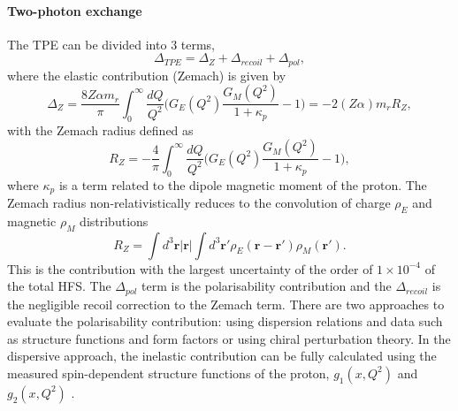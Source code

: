 \documentclass[12pt]{article}
\begin{document}
\paragraph{Two-photon exchange}
The TPE can be divided into $3$ terms,
\begin{equation}
\Delta_{TPE} = \Delta_{Z} + \Delta_{recoil} + \Delta_{pol},
\end{equation}
where the elastic contribution (Zemach) is given by
\begin{equation}
\Delta_{Z} = \frac{8Z{\alpha{m_r}}}{\pi} \int_0^{\infty} \frac{dQ}{Q^2} \Bigg( G_{E}(Q^2) \frac{G_M(Q^2)}{1+\kappa_p} - 1 \Bigg) = -2 (Z{\alpha}) m_r R_Z,
\end{equation}
with the Zemach radius defined as 
\begin{equation}
R_Z = - \frac{4}{\pi} \int_0^{\infty} \frac{dQ}{Q^2} \Bigg( G_E(Q^2) \frac{G_M(Q^2)}{1 + \kappa_p} - 1 \Bigg),
\end{equation}
where ${\kappa}_p$ is a term related to the dipole magnetic moment of the proton. The Zemach radius non-relativistically reduces to the convolution of charge $\rho_{E}$ and magnetic $\rho_{M}$ distributions
\begin{equation}
R_Z = \int d^3 \bm{r} |\bm{r}| \int d^3 \bm{r'} \rho_{E} (\bm{r} - \bm{r'}) \rho_{M} (\bm{r'}).
\end{equation}
This is the contribution with the largest uncertainty of the order of $1 \times 10^{-4}$ of the total HFS. The ${\Delta}_{pol}$ term is the polarisability contribution and the ${\Delta}_{recoil}$ is the negligible recoil correction to the Zemach term. There are two approaches to evaluate the polarisability contribution: using dispersion relations and data such as structure functions and form factors or using chiral perturbation theory. In the dispersive approach, the inelastic contribution can be fully calculated using the measured spin-dependent structure functions of the proton, $g_1(x,Q^2)$ and $g_2(x,Q^2)$ \cite{proposal}.

\end{document}
